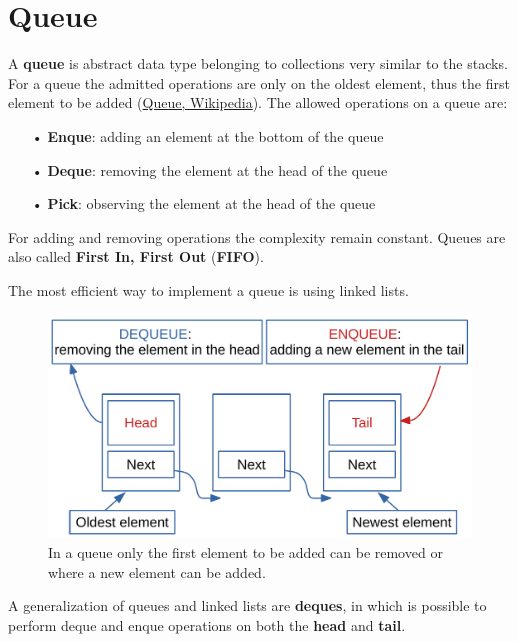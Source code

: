 \section{Queue}
\label{queue}
A \textbf{queue} is abstract data type belonging to collections very similar to the stacks. For a queue the admitted operations are only on the oldest element, thus the first element to be added \cite{wikiqueue} (\href{https://en.wikipedia.org/wiki/Queue_(abstract_data_type)}{Queue, Wikipedia}). The allowed operations on a queue are:
\begin{itemize}
\item[•] \textbf{Enque}: adding an element at the bottom of the queue
\item[•] \textbf{Deque}: removing the element at the head of the queue
\item[•] \textbf{Pick}: observing the element at the head of the queue
\end{itemize}
For adding and removing operations the complexity remain constant. Queues are also called \textbf{First In, First Out} (\textbf{FIFO}). 

The most efficient way to implement a queue is using linked lists.

\begin{figure}[H]
	\begin{center}
		\includegraphics[scale=.6]{chapters/datastructures/images/queue_1.pdf}
		\caption[Allowed operations on queue elements.]{In a queue only the first element to be added can be removed or where a new element can be added.}
		\label{queue_1}
	\end{center}
\end{figure}

A generalization of queues and linked lists are \textbf{deques}, in which is possible to perform deque and enque operations on both the \textbf{head} and \textbf{tail}.

